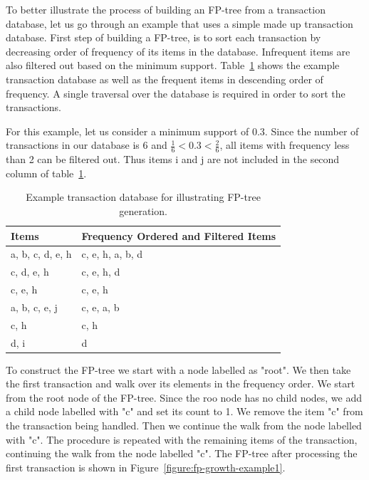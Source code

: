 To better illustrate the process of building an FP-tree from a transaction database, let us go through an example that uses a simple made up transaction database. First step of building a FP-tree, is to sort each transaction by decreasing order of frequency of its items in the database. Infrequent items are also filtered out based on the minimum support. Table~\ref{table:fp-growth-example1} shows the example transaction database as well as the frequent items in descending order of frequency. A single traversal over the database is required in order to sort the transactions.

For this example, let us consider a minimum support of 0.3. Since the number of transactions in our database is 6 and $ \frac{1}{6} < 0.3 < \frac{2}{6} $, all items with frequency less than 2 can be filtered out. Thus items i and j are not included in the second column of table~\ref{table:fp-growth-example1}. 

\begin{table} %
\begin{center}
    \begin{tabular}{ | l | l | }
    \hline
	\textbf{Items} & \textbf{Frequency Ordered and Filtered Items} \\ \hline
    a, b, c, d, e, h & c, e, h, a, b, d \\ \hline 
    c, d, e, h & c, e, h, d \\ \hline 
    c, e, h & c, e, h \\ \hline 
    a, b, c, e, j & c, e, a, b \\ \hline 
    c, h & c, h \\ \hline
    d, i & d \\ \hline
    \end{tabular}
    \caption{Example transaction database for illustrating FP-tree generation.}
    \label{table:fp-growth-example1}
\end{center}
\end{table} 

To construct the FP-tree we start with a node labelled as "root". We then take the first transaction and walk over its elements in the frequency order. We start from the root node of the FP-tree. Since the roo node has no child nodes, we add a child node labelled with "c" and set its count to 1. We remove the item "c" from the transaction being handled. Then we continue the walk from the node labelled with "c". The procedure is repeated with the remaining items of the transaction, continuing the walk from the node labelled "c". The FP-tree after processing the first transaction is shown in Figure~\ref{figure:fp-growth-example1}.

